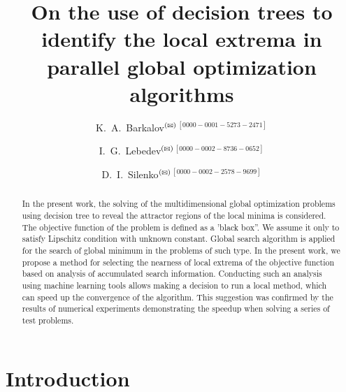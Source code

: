 \documentclass{svproc}
\def\orcidID#1{\unskip$^{[#1]}$}
\def\letter{$^{\textrm{(\Letter)}}$}
\begin{document}
\mainmatter              %
%
\title{On the use of decision trees to identify the local extrema in parallel global optimization algorithms}
%
%
\author{K.~A.~Barkalov\letter\orcidID{0000-0001-5273-2471} \and I.~G.~Lebedev\letter\orcidID{0000-0002-8736-0652} \and D.~I.~Silenko\letter\orcidID{0000-0002-2578-9699}}
%
%
%

\maketitle              %

\begin{abstract}
In the present work, the solving of the multidimensional global optimization problems using decision  tree to reveal the attractor regions of the local minima is considered. The objective function of the  problem is defined as a 'black box''.  We assume it only to satisfy Lipschitz condition with unknown constant.  Global search algorithm is applied for the search of global minimum in the problems of such type. In the present work, we propose a method for selecting the nearness of local extrema of the objective  function based on analysis of accumulated search information. Conducting such an analysis using machine learning tools allows making a decision to run a local  method, which can speed up the convergence of the algorithm.  This suggestion was confirmed by the results of numerical experiments demonstrating the speedup  when solving a series of test problems.
\end{abstract}
%

\section{Introduction}
\end{document}
